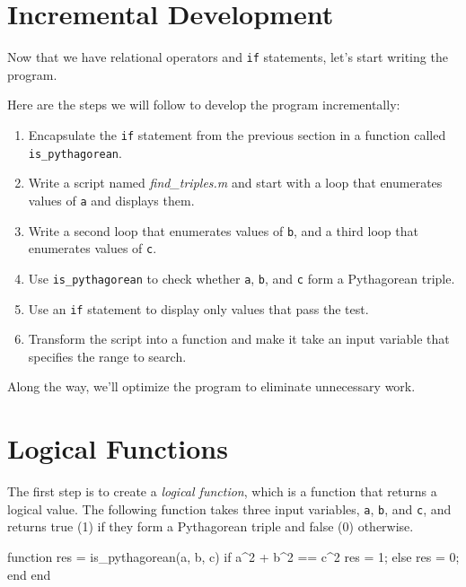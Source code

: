 \section{Incremental Development}
\label{increxample}

Now that we have relational operators and \lstinline{if} statements, let's start writing
the program.

Here are the steps we will follow to develop the program incrementally:

\begin{enumerate}

\item Encapsulate the \lstinline{if} statement from the previous section in a function called \lstinline{is_pythagorean}.

\item Write a script named \emph{find_triples.m} and start with a loop that enumerates values of \lstinline{a} and displays them.

\item Write a second loop that enumerates values of \lstinline{b}, and a third loop that enumerates values of \lstinline{c}.

\item Use \lstinline{is_pythagorean} to check whether \lstinline{a}, \lstinline{b}, and \lstinline{c} form a Pythagorean triple.

\item Use an \lstinline{if} statement to display only values that pass the test.

\item Transform the script into a function and make it take an input variable that specifies the range to search.

\end{enumerate}

Along the way, we'll optimize the program to eliminate unnecessary work.


\section{Logical Functions}

The first step is to create a \emph{logical function}, which is a function that returns a logical value.
The following function takes three input variables, \lstinline{a}, \lstinline{b}, and \lstinline{c}, and returns true (1) if they form a Pythagorean triple and false (0) otherwise.

\begin{code}
function res = is_pythagorean(a, b, c)
    if a^2 + b^2 == c^2
        res = 1;
    else
        res = 0;
    end
end
\end{code}

